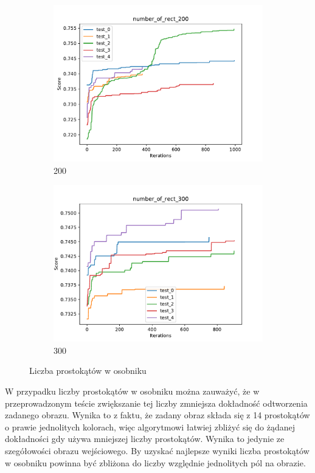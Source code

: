 \begin{figure}[H]
\begin{subfigure}[b]{0.49\linewidth}
        \includegraphics[width=\linewidth]{img/number_of_rect_200.pdf}
        \caption{200}
    \end{subfigure}
    \begin{subfigure}[b]{0.49\linewidth}
        \includegraphics[width=\linewidth]{img/number_of_rect_300.pdf}
        \caption{300}
    \end{subfigure}
    \caption{Liczba prostokątów w osobniku}
    \label{fig:picking}
\end{figure}

W przypadku liczby prostokątów w osobniku można zauważyć, że w przeprowadzonym teście zwiększanie tej liczby zmniejsza dokładność odtworzenia zadanego obrazu. Wynika to z faktu, że zadany obraz składa się z 14 prostokątów o prawie jednolitych kolorach, więc algorytmowi łatwiej zbliżyć się do żądanej dokładności gdy używa mniejszej liczby prostokątów. Wynika to jedynie ze szegółowości obrazu wejściowego. By uzyskać najlepsze wyniki liczba prostokątów w osobniku powinna być zbliżona do liczby względnie jednolitych pól na obrazie.
